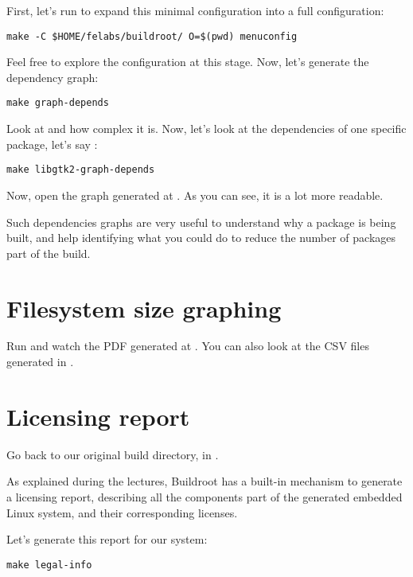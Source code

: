 First, let's run  to expand this minimal
configuration into a full configuration:

\begin{verbatim}
make -C $HOME/felabs/buildroot/ O=$(pwd) menuconfig
\end{verbatim}

Feel free to explore the configuration at this stage. Now, let's
generate the dependency graph:

\begin{verbatim}
make graph-depends
\end{verbatim}

Look at  and how complex it is. Now,
let's look at the dependencies of one specific package, let's say
:

\begin{verbatim}
make libgtk2-graph-depends
\end{verbatim}

Now, open the graph generated at
. As you can see, it is a lot
more readable.

Such dependencies graphs are very useful to understand why a package
is being built, and help identifying what you could do to reduce the
number of packages part of the build.

\section{Filesystem size graphing}

Run  and watch the PDF generated at
. You can also look at the CSV
files generated in .

\section{Licensing report}

Go back to our original build directory, in
.

As explained during the lectures, Buildroot has a built-in mechanism
to generate a licensing report, describing all the components part of
the generated embedded Linux system, and their corresponding licenses.

Let's generate this report for our system:

\begin{verbatim}
make legal-info
\end{verbatim}

